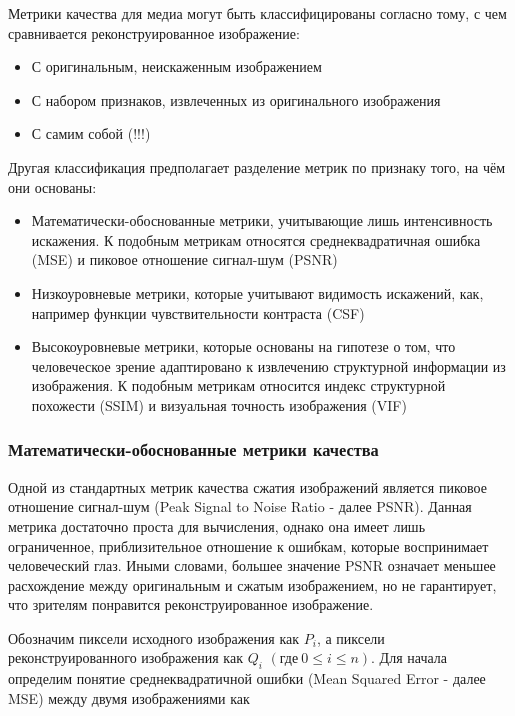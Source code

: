 Метрики качества для медиа могут быть классифицированы согласно тому, с чем
сравнивается реконструированное изображение\cite{SSIMArticle}:

\begin{itemize}
    \item С оригинальным, неискаженным изображением
    \item С набором признаков, извлеченных из оригинального изображения
    \item С самим собой (!!!)
\end{itemize}

Другая классификация предполагает разделение метрик по признаку того, на чём они
основаны\cite[6]{FullReferenceIQMetrics}:

\begin{itemize}
    \item Математически-обоснованные метрики, учитывающие лишь интенсивность
    искажения. К подобным метрикам относятся среднеквадратичная ошибка (MSE) и пиковое
    отношение сигнал-шум (PSNR)
    \item Низкоуровневые метрики, которые учитывают видимость искажений, как,
    например функции чувствительности контраста (CSF)
    \item Высокоуровневые метрики, которые основаны на гипотезе о том, что
    человеческое зрение адаптировано к извлечению структурной информации из
    изображения. К подобным метрикам относится индекс структурной похожести
    (SSIM) и визуальная точность изображения (VIF)
\end{itemize}

\subsubsection{Математически-обоснованные метрики качества}

Одной из стандартных метрик качества сжатия изображений является пиковое
отношение сигнал-шум (Peak Signal to Noise Ratio - далее PSNR). Данная метрика
достаточно проста для вычисления, однако она имеет лишь ограниченное,
приблизительное отношение к ошибкам, которые воспринимает человеческий глаз.
Иными словами, большее значение PSNR означает меньшее расхождение между
оригинальным и сжатым изображением, но не гарантирует, что зрителям понравится
реконструированное изображение\cite[279]{DataCompression}.

Обозначим пиксели исходного изображения как $P_{i}$, а пиксели
реконструированного изображения как $Q_{i}$ $\left(\text{где} \ 0 \le i \le
n\right)$. Для начала определим понятие среднеквадратичной ошибки (Mean Squared
Error - далее MSE) между двумя изображениями как

